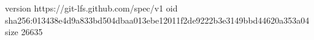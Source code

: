 version https://git-lfs.github.com/spec/v1
oid sha256:013438e4d9a833bd504dbaa013ebe12011f2de9222b3e3149bbd44620a353a04
size 26635
